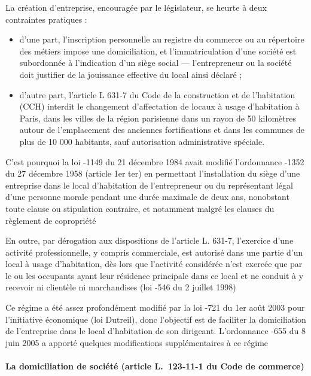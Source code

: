 			La création d’entreprise, encouragée par le législateur, se heurte à deux contraintes pratiques :
			\begin{itemize}
				\item d’une part, l’inscription personnelle au registre du commerce ou au répertoire des métiers impose une domiciliation, et l’immatriculation d’une société est subordonnée à l’indication d’un siège social --- l’entrepreneur ou la société doit justifier de la jouissance effective du local ainsi déclaré ;
				\item d’autre part, l’article L 631-7 du Code de la construction et de l’habitation (CCH) interdit le changement d’affectation de locaux à usage d’habitation à Paris, dans les villes de la région parisienne dans un rayon de 50 kilomètres autour de l’emplacement des anciennes fortifications et dans les communes de plus de 10 000 habitants, sauf autorisation administrative spéciale.
			\end{itemize}
		
			C’est pourquoi la loi -1149 du 21 décembre 1984 avait modifié l’ordonnance -1352 du 27 décembre 1958 (article 1er ter) en permettant l’installation du siège d’une entreprise dans le local d’habitation de l’entrepreneur ou du représentant légal d’une personne morale pendant une durée
			maximale de deux ans, nonobstant toute clause ou stipulation contraire, et notamment malgré les clauses du règlement de copropriété
			
			En outre, par dérogation aux dispositions de l'article L. 631-7, l'exercice d'une activité professionnelle, y compris commerciale, est autorisé dans une partie d'un local à usage d'habitation, dès lors que l'activité considérée n'est exercée que par le ou les occupants ayant leur résidence principale dans ce local et ne conduit à y recevoir ni clientèle ni marchandises (loi -546 du 2 juillet 1998)
			
			Ce régime a été assez profondément modifié par la loi -721 du 1er août 2003 pour l'initiative économique (loi Dutreil), donc l’objectif est de faciliter la domiciliation de l'entreprise dans le local d'habitation de son dirigeant. L’ordonnance -655 du 8 juin 2005 a apporté quelques modifications supplémentaires à ce régime
			
			\paragraph{La domiciliation de société (article L.~123-11-1 du Code de commerce)}
			
